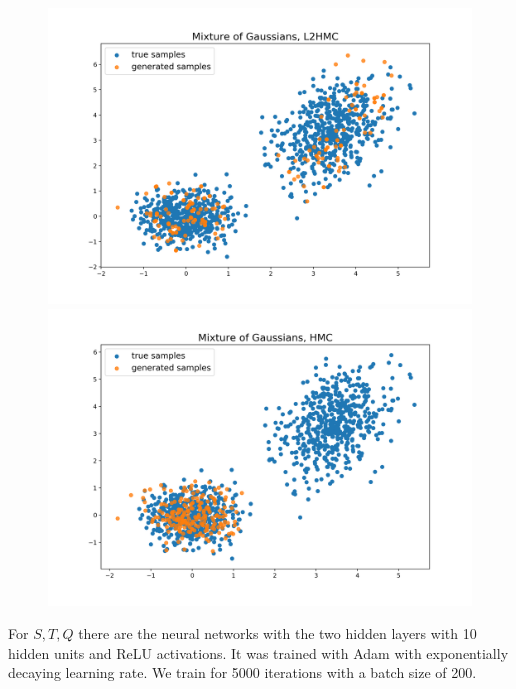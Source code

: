 \documentclass{article}
\begin{document}
\begin{figure}[H]
\centering
\begin{minipage}{.5\textwidth}
  \centering
  \includegraphics[width=\linewidth]{Mixture_of_Gaussians_L2HMC.png}
\end{minipage}%
\begin{minipage}{.5\textwidth}
  \centering
  \includegraphics[width=\linewidth]{Mixture_of_Gaussians_HMC.png}
\end{minipage}
\end{figure}

For $S, T, Q$ there are the neural networks with the two hidden layers with 10 hidden units and ReLU activations. It was trained with Adam with exponentially decaying learning rate. We train for 5000 iterations with a batch size of 200.
\end{document}
